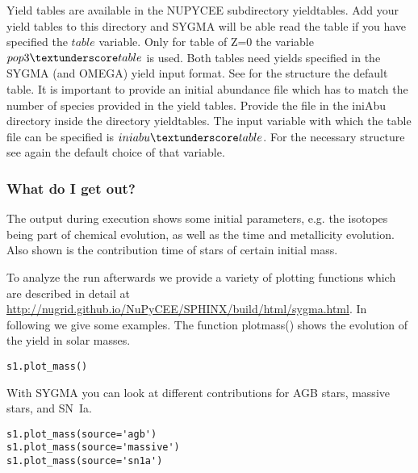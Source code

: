 Yield tables are available in the NUPYCEE subdirectory 
yield\textunderscore tables. Add your yield tables to
this directory and SYGMA will be able read the table
if you have specified the $table$ variable. Only
for table of Z=0 the variable $pop3\textunderscore table$ is used.
Both tables need yields specified in the SYGMA (and OMEGA)
yield input format. See for the structure the default table.
It is important to provide an initial abundance
file which has to match the number of species provided in the yield tables.
Provide the file in the iniAbu directory inside the directory yield\textunderscore tables.
The input variable with which the table file can be specified is $iniabu\textunderscore table$.
For the necessary structure see again the default choice of that variable.


\subsubsection{What do I get out?}


The output during execution shows some initial parameters,
e.g. the isotopes being part of chemical evolution,
as well as the time and metallicity evolution.
Also shown is the contribution time of stars of 
certain initial mass.




To analyze the run afterwards we provide a variety of plotting  functions
which are described in detail at \url{http://nugrid.github.io/NuPyCEE/SPHINX/build/html/sygma.html}.
In following we give some examples. The function plot\textunderscore mass() shows the evolution
of the yield in solar masses.


\begin{verbatim}
s1.plot_mass()
\end{verbatim}

With SYGMA you can look at different contributions
for AGB stars, massive stars, and SN~Ia.

\begin{verbatim}
s1.plot_mass(source='agb')
s1.plot_mass(source='massive')
s1.plot_mass(source='sn1a')

\end{verbatim}

